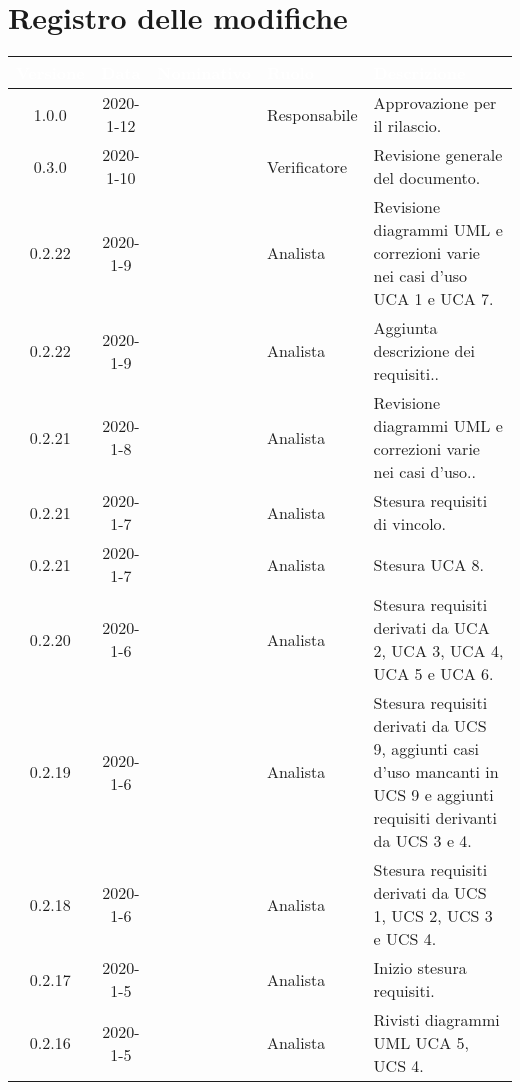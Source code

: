 \section*{Registro delle modifiche}
{
\renewcommand{\arraystretch}{1.5}
\centering
\begin{longtable}{ c c  C{4cm}  C{3cm} C{4cm}}
   \textcolor{white}{\textbf{Versione}} &
   \textcolor{white}{\textbf{Data}}&
   \textcolor{white}{\textbf{Nominativo}}&
   \textcolor{white}{\textbf{Ruolo}}&
   \textcolor{white}{\textbf{Descrizione}}\\
   \endhead


1.0.0 & 2020-1-12 & \AT{} & Responsabile & Approvazione per il rilascio. \\

0.3.0 & 2020-1-10 & \SE{} & Verificatore & Revisione generale del documento. \\

0.2.22 & 2020-1-9 & \PF{} & Analista & Revisione diagrammi UML e correzioni varie nei casi d'uso UCA 1 e UCA 7. \\

0.2.22 & 2020-1-9 & \CE{} & Analista & Aggiunta descrizione dei requisiti.. \\

0.2.21 & 2020-1-8 & \CE{} & Analista & Revisione diagrammi UML e correzioni varie nei casi d'uso.. \\

0.2.21 & 2020-1-7 & \PF{} & Analista & Stesura requisiti di vincolo. \\

0.2.21 & 2020-1-7 & \PF{} & Analista & Stesura UCA 8. \\

0.2.20 & 2020-1-6 & \PF{} & Analista & Stesura requisiti derivati da UCA 2, UCA 3, UCA 4, UCA 5 e UCA 6. \\

0.2.19 & 2020-1-6 & \DF{} & Analista & Stesura requisiti derivati da UCS 9, aggiunti casi d'uso mancanti in UCS 9 e aggiunti requisiti derivanti da UCS 3 e 4. \\

0.2.18 & 2020-1-6 & \CE{} & Analista & Stesura requisiti derivati da UCS 1, UCS 2, UCS 3 e UCS 4. \\

0.2.17 & 2020-1-5 & \CE{} & Analista & Inizio stesura requisiti. \\

0.2.16 & 2020-1-5 & \DF{} & Analista & Rivisti diagrammi UML UCA 5, UCS 4. \\


\end{longtable}}
